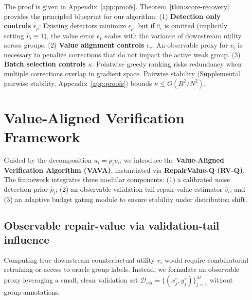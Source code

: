 \documentclass{article}
\begin{document}
The proof is given in Appendix~\ref{app:proofs}. Theorem~\ref{thm:score-recovery} provides the principled blueprint for our algorithm:
(1) \textbf{Detection only controls $\epsilon_p$}: Existing detectors minimize $\epsilon_p$, but if $\hat v_i$ is omitted (implicitly setting $\hat v_i \equiv 1$), the value error $\epsilon_v$ scales with the variance of downstream utility across groups.
(2) \textbf{Value alignment controls $\epsilon_v$}: An observable proxy for $v_i$ is necessary to penalize corrections that do not impact the active weak group.
(3) \textbf{Batch selection controls $\kappa$}: Pointwise greedy ranking risks redundancy when multiple corrections overlap in gradient space. Pairwise stability (Supplemental pairwise stability, Appendix~\ref{app:proofs}) bounds $\kappa \le O(B^2/N^2)$.

\section{Value-Aligned Verification Framework}
\label{sec:method}

Guided by the decomposition $u_i = p_i v_i$, we introduce the \textbf{Value-Aligned Verification Algorithm (VAVA)}, instantiated via \textbf{RepairValue-Q (RV-Q)}. The framework integrates three modular components: (1) a calibrated noise detection prior $\hat p_i$; (2) an observable validation-tail repair-value estimator $\hat v_i$; and (3) an adaptive budget gating module to ensure stability under distribution shift.

\subsection{Observable repair-value via validation-tail influence}
\label{sec:tail_influence}

Computing true downstream counterfactual utility $v_i$ would require combinatorial retraining or access to oracle group labels. Instead, we formulate an observable proxy leveraging a small, clean validation set $\mathcal D_{val} = \{(x_j^v, y_j^v)\}_{j=1}^M$ without group annotations.
\end{document}
